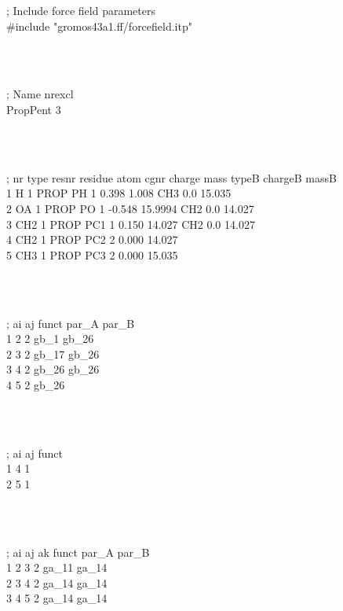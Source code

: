 \begin{tt}
; Include force field parameters\\
\#include "gromos43a1.ff/forcefield.itp"\\
\end{tt}\\
\begin{tt}
[ moleculetype ]\\
; Name            nrexcl\\
PropPent          3\\
\end{tt}\\
\begin{tt}
[ atoms ]\\
; nr type resnr residue atom cgnr  charge    mass  typeB chargeB  massB\\
  1    H    1     PROP    PH    1   0.398    1.008  CH3     0.0  15.035\\
  2   OA    1     PROP    PO    1  -0.548  15.9994  CH2     0.0  14.027\\
  3  CH2    1     PROP   PC1    1   0.150   14.027  CH2     0.0  14.027\\
  4  CH2    1     PROP   PC2    2   0.000   14.027\\
  5  CH3    1     PROP   PC3    2   0.000   15.035\\
\end{tt}\\
\begin{tt}
[ bonds ]\\
;  ai    aj funct    par\_A  par\_B \\
    1     2     2    gb\_1   gb\_26\\
    2     3     2    gb\_17  gb\_26\\
    3     4     2    gb\_26  gb\_26\\
    4     5     2    gb\_26\\
\end{tt}\\
\begin{tt}
[ pairs ]\\
;  ai    aj funct\\
    1     4     1\\
    2     5     1\\
\end{tt}\\
\begin{tt}
[ angles ]\\
;  ai    aj    ak funct    par\_A   par\_B\\
    1     2     3     2    ga\_11   ga\_14\\
    2     3     4     2    ga\_14   ga\_14\\
    3     4     5     2    ga\_14   ga\_14\\
\end{tt}\\
